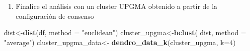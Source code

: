 \documentclass[
]{article}
\newenvironment{Shaded}{\begin{snugshade}}{\end{snugshade}}
\newcommand{\DataTypeTok}[1]{\textcolor[rgb]{0.13,0.29,0.53}{#1}}
\newcommand{\DecValTok}[1]{\textcolor[rgb]{0.00,0.00,0.81}{#1}}
\newcommand{\KeywordTok}[1]{\textcolor[rgb]{0.13,0.29,0.53}{\textbf{#1}}}
\newcommand{\NormalTok}[1]{#1}
\newcommand{\StringTok}[1]{\textcolor[rgb]{0.31,0.60,0.02}{#1}}
\providecommand{\tightlist}{%
  \setlength{\itemsep}{0pt}\setlength{\parskip}{0pt}}
\begin{document}
\begin{enumerate}
\def\labelenumi{\Alph{enumi})}
\tightlist
\item
  Finalice el análisis con un cluster UPGMA obtenido a partir de la
  configuración de consenso
\end{enumerate}

\begin{Shaded}
\begin{Highlighting}[]
\NormalTok{dist<-}\KeywordTok{dist}\NormalTok{(df, }\DataTypeTok{method =} \StringTok{"euclidean"}\NormalTok{)}
\NormalTok{cluster_upgma<-}\KeywordTok{hclust}\NormalTok{( dist, }\DataTypeTok{method =} \StringTok{"average"}\NormalTok{)}
\NormalTok{cluster_upgma_data<-}\StringTok{ }\KeywordTok{dendro_data_k}\NormalTok{(cluster_upgma, }\DataTypeTok{k=}\DecValTok{4}\NormalTok{)}


\end{Highlighting}
\end{Shaded}
\end{document}
